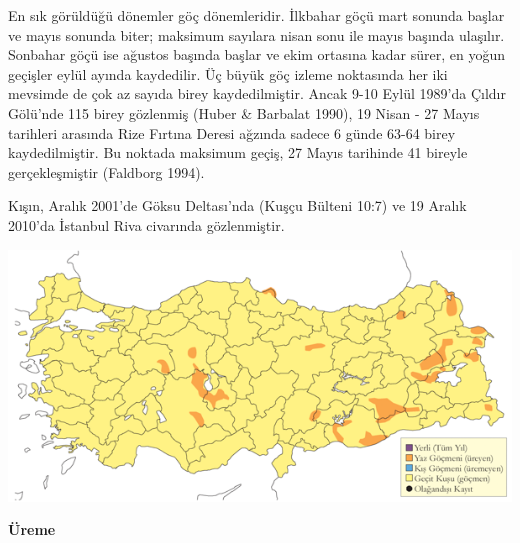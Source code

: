 \documentclass[
  letterpaper,
  DIV=11,
  numbers=noendperiod]{scrreprt}
\begin{document}
En sık görüldüğü dönemler göç dönemleridir. İlkbahar göçü mart sonunda
başlar ve mayıs sonunda biter; maksimum sayılara nisan sonu ile mayıs
başında ulaşılır. Sonbahar göçü ise ağustos başında başlar ve ekim
ortasına kadar sürer, en yoğun geçişler eylül ayında kaydedilir. Üç
büyük göç izleme noktasında her iki mevsimde de çok az sayıda birey
kaydedilmiştir. Ancak 9-10 Eylül 1989'da Çıldır Gölü'nde 115 birey
gözlenmiş (Huber \& Barbalat 1990), 19 Nisan - 27 Mayıs tarihleri
arasında Rize Fırtına Deresi ağzında sadece 6 günde 63-64 birey
kaydedilmiştir. Bu noktada maksimum geçiş, 27 Mayıs tarihinde 41 bireyle
gerçekleşmiştir (Faldborg 1994).

Kışın, Aralık 2001'de Göksu Deltası'nda (Kuşçu Bülteni 10:7) ve 19
Aralık 2010'da İstanbul Riva civarında gözlenmiştir.

\includegraphics{images/harita_Page_105.png}

\textbf{Üreme}
\end{document}
